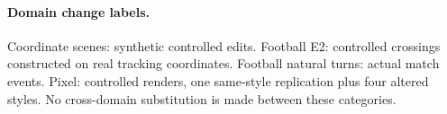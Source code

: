 \paragraph{Domain change labels.} Coordinate scenes: synthetic controlled
edits. Football E2: controlled crossings constructed on real tracking
coordinates. Football natural turns: actual match events. Pixel:
controlled renders, one same-style replication plus four altered styles.
No cross-domain substitution is made between these categories.
